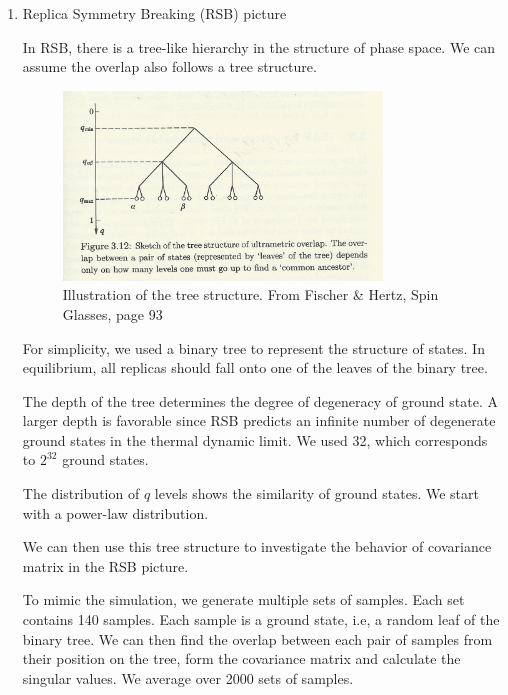 \begin{enumerate}
\item{Replica Symmetry Breaking (RSB) picture}

In RSB, there is a tree-like hierarchy in the structure of phase space.
We can assume the overlap also follows a tree structure. 

\begin{figure}[ht]
  \centering
  \includegraphics[width=0.8\textwidth]{img/matrix/tree.png}
  \caption{Illustration of the tree structure. From Fischer \& Hertz, Spin Glasses, page 93}
  \label{fig:tree}
\end{figure}


For simplicity, we used a binary tree to represent the structure of states. 
In equilibrium, all replicas should fall onto one of the leaves of the binary tree. 

The depth of the tree determines the degree of degeneracy of ground state. 
A larger depth is favorable since RSB predicts an infinite number of 
degenerate ground states in the thermal dynamic limit. We used 32,
 which corresponds to $2^{32}$ ground states.


The distribution of $q$ levels shows the similarity of ground states.
We start with a power-law distribution. 

We can then use this tree structure to investigate the behavior of covariance matrix
in the RSB picture.

To mimic the simulation, we generate multiple sets of samples. Each set contains
140 samples. Each sample is a ground state, i.e, a random leaf of the binary tree. 
We can then find the overlap between each pair of samples 
from their position on the tree, form the covariance
matrix and calculate the singular values. 
We average over 2000 sets of samples.


\end{enumerate}

